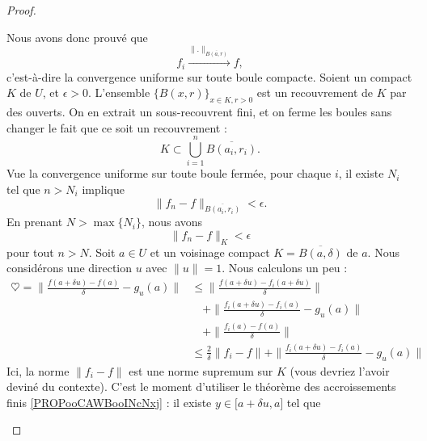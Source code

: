 \begin{proof}
\begin{subproof}
		Nous avons donc prouvé que
		\begin{equation}
			f_i\stackrel{\| . \|_{\overline{ B(a,r) }}}{\longrightarrow}f,
		\end{equation}
		c'est-à-dire la convergence uniforme sur toute boule compacte.
		Soient un compact \( K\) de \( U\), et \( \epsilon>0\). L'ensemble \( \{ B(x,r) \}_{x\in K, r>0}\) est un recouvrement de \( K\) par des ouverts. On en extrait un sous-recouvrent fini, et on ferme les boules sans changer le fait que ce soit un recouvrement :
		\begin{equation}
			K\subset \bigcup_{i=1}^n\overline{ B(a_i, r_i) }.
		\end{equation}
		Vue la convergence uniforme sur toute boule fermée, pour chaque \( i\), il existe \( N_i\) tel que \( n>N_i\) implique
		\begin{equation}
			\| f_n-f \|_{\overline{ B(a_i,r_i) }}<\epsilon.
		\end{equation}
		En prenant \( N>\max\{ N_i \}\), nous avons
		\begin{equation}
			\| f_n-f \|_K<\epsilon
		\end{equation}
		pour tout \( n>N\).
		Soit \( a\in U\) et un voisinage compact \( K=\overline{ B(a,\delta) }\) de \( a\). Nous considérons une direction \( u\) avec \( \| u \|=1\). Nous calculons un peu :
		\begin{subequations}
			\begin{align}
				\heartsuit=\| \frac{ f(a+\delta u)-f(a) }{ \delta }-g_u(a) \| & \leq \| \frac{ f(a+\delta u)-f_i(a+\delta u) }{ \delta } \|                               \\
				                                                              & \quad +\|  \frac{ f_i(a+\delta u)-f_i(a) }{ \delta }-g_u(a) \|      \nonumber             \\
				                                                              & \quad +\| \frac{ f_i(a)-f(a) }{ \delta } \|        \nonumber                              \\
				                                                              & \leq \frac{ 2 }{ \delta }\| f_i-f \|+\| \frac{ f_i(a+\delta u)-f_i(a) }{ \delta }-g_u(a) \|
			\end{align}
		\end{subequations}
		Ici, la norme \( \| f_i-f \|\) est une norme supremum sur \( K\) (vous devriez l'avoir deviné du contexte). C'est le moment d'utiliser le théorème des accroissements finis \ref{PROPooCAWBooINcNxj} : il existe \( y\in \mathopen[ a+\delta u , a \mathclose]\) tel que

\end{subproof}
\end{proof}
